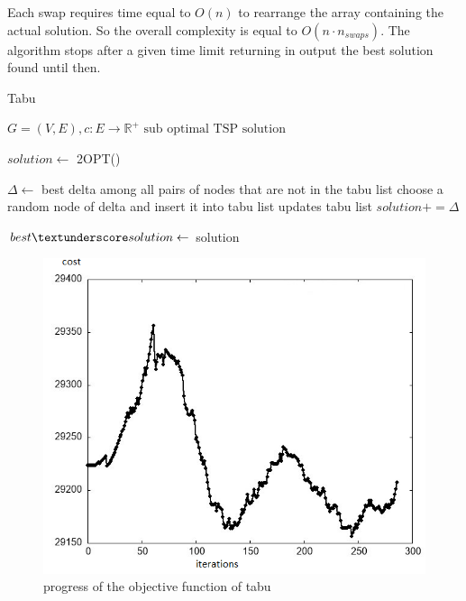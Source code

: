 Each swap requires time equal to $O(n)$ to rearrange the array containing the actual solution. So the overall complexity is equal to $O(n \cdot n_{swaps})$.
The algorithm stops after a given time limit returning in output the best solution found until then.

\begin{algorithm}[h!]
    \caption{Tabu}\label{algo:tabu}
    \begin{algorithmic}[1]
    \Require $G = (V,E), c:E \to \mathbb{R}^+$
    \Ensure $\text{sub optimal TSP solution}$


    \State $solution \gets$ 2OPT()
    
    \State $\Delta\gets$ best delta among all pairs of nodes that are not in the tabu list
    \State choose a random node of delta and insert it into tabu list
    \State updates tabu list
    \State $solution += \Delta$

    \State $ best\textunderscore solution \gets$ solution
    \EndIf
    

    \EndWhile

    \end{algorithmic}
\end{algorithm}

\begin{figure}[!h]
    \centering
    \includegraphics[scale=0.8]{images/tabuperf.png}
    \caption{progress of the objective function of tabu}
    \label{fig:TABUPERF}
\end{figure}

